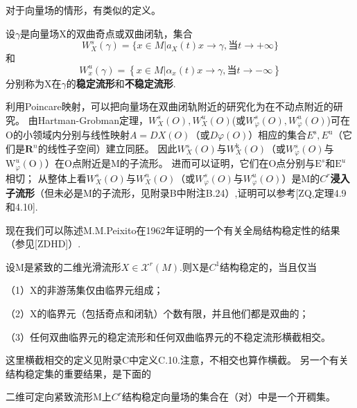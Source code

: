   对于向量场的情形，有类似的定义。

  \begin{defination}
    设\(\gamma\)是向量场X的双曲奇点或双曲闭轨，集合
    \[W _ { X} ^ { s } ( \gamma ) = \{ x \in M | a _ { X } ( t ) x \rightarrow \gamma , 当 t \rightarrow + \infty \}\]
    和
    \[W _ { x } ^ { u } ( \gamma ) = \left\{ x \in M \left| \alpha _ { x } ( t ) x \rightarrow \gamma\right.,当 t \rightarrow - \infty \right\}\]
    分别称为X在\(\gamma\)的\textbf{稳定流形}和\textbf{不稳定流形}.
  \end{defination}
  利用Poincare映射，可以把向量场在双曲闭轨附近的研究化为在不动点附近的研究。
  由Hartman-Grobman定理，$W _ { X } ^ { s} ( O ) , W _ { X } ^ { u} ( O )$(或$W _ { \varphi } ^ { s } ( O ) , W _ { \varphi } ^ { u } ( O )$)可在O的小领域内分别与线性映射$A = D X ( O )$（或$D \varphi ( O )$）相应的集合$E ^ { \mathrm { s } } , E ^ { \mathrm { u } }$（它们是\(\mathbf{R}^n\)的线性子空间）建立同胚。
  因此$W _ { X } ^ { s } ( O )$与$W _ { X } ^ { \mathrm { k } } ( O )$（或$W _ { \varphi } ^ { s } ( O )$与$\mathrm { W } _ { \varphi } ^ { u } ( \mathrm { O } )$）在O点附近是M的子流形。
  进而可以证明，它们在O点分别与\(\mathrm{E}^s\)和\(\mathrm{E}^u\)相切；
  从整体上看$W _ { X } ^ { s} ( O )$与$W _ { X } ^ { n} ( O )$（或$W _ { \varphi } ^ { s} ( O )$与$W _ { \varphi } ^ { u} ( O )$）是M的\(C^r\)\textbf{浸入子流形}（但未必是M的子流形，见附录B中附注B.24）,证明可以参考[ZQ,定理4.9和4.10].

  现在我们可以陈述M.M.Peixito在1962年证明的一个有关全局结构稳定性的结果（参见[ZDHD]）.

  \begin{theorem}
    设M是紧致的二维光滑流形$X \in \mathscr { X} ^ { r } ( M )$.则X是\(C^1\)结构稳定的，当且仅当


    （1）X的非游荡集仅由临界元组成；

    （2）X的临界元（包括奇点和闭轨）个数有限，并且他们都是双曲的；

    （3）任何双曲临界元的稳定流形和任何双曲临界元的不稳定流形横截相交。
  \end{theorem}
  这里横截相交的定义见附录C中定义C.10.注意，不相交也算作横截。
  另一个有关结构稳定集的重要结果，是下面的
  \begin{theorem}
二维可定向紧致流形M上\(C^r\)结构稳定向量场的集合在（对）中是一个开稠集。
  \end{theorem}

